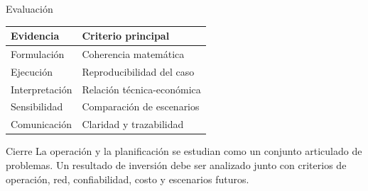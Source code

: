 \documentclass[aspectratio=169]{beamer}
\begin{document}
\begin{frame}{Evaluación}
  \begin{table}
    \centering
    \begin{tabular}{ll}
      \toprule
      Evidencia & Criterio principal \\
      \midrule
      Formulación & Coherencia matemática \\
      Ejecución & Reproducibilidad del caso \\
      Interpretación & Relación técnica-económica \\
      Sensibilidad & Comparación de escenarios \\
      Comunicación & Claridad y trazabilidad \\
      \bottomrule
    \end{tabular}
  \end{table}
\end{frame}

\begin{frame}{Cierre}
  La operación y la planificación se estudian como un conjunto articulado de problemas. Un resultado de inversión debe ser analizado junto con criterios de operación, red, confiabilidad, costo y escenarios futuros.
\end{frame}
\end{document}
